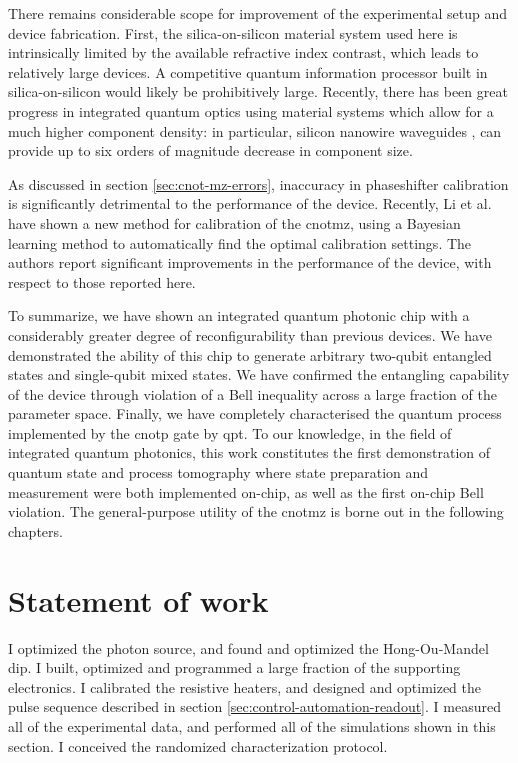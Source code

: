 There remains considerable scope for improvement of the experimental setup and device fabrication. First, the silica-on-silicon material system used here is intrinsically limited by the available refractive index contrast, which leads to relatively large devices. A competitive quantum information processor built in silica-on-silicon would likely be prohibitively large. Recently, there has been great progress in integrated quantum optics using material systems which allow for a much higher component density: in particular, silicon nanowire waveguides \cite{Silverstone2013, Matsuda2012, Azzini2012, Takesue2008, Sharping2006, Bonneau2012, Martin2012}, can provide up to six orders of magnitude decrease in component size. 

As discussed in section \ref{sec:cnot-mz-errors}, inaccuracy in phaseshifter calibration is significantly detrimental to the performance of the device. Recently, Li et al. \cite{Li2013} have shown a new method for calibration of the \gls{cnotmz}, using a Bayesian learning method to automatically find the optimal calibration settings. The authors report significant improvements in the performance of the device, with respect to those reported here.


To summarize, we have shown an integrated quantum photonic chip with a considerably greater degree of reconfigurability than previous devices. We have demonstrated the ability of this chip to generate arbitrary two-qubit entangled states and single-qubit mixed states. We have confirmed the entangling capability of the device through violation of a Bell inequality across a large fraction of the parameter space. Finally, we have completely characterised the quantum process implemented by the \gls{cnotp} gate by \gls{qpt}. To our knowledge, in the field of integrated quantum photonics, this work constitutes the first demonstration of quantum state and process tomography where state preparation and measurement were both implemented on-chip, as well as the first on-chip Bell violation.  
The general-purpose utility of the \gls{cnotmz} is borne out in the following chapters.

\section*{Statement of work}
I optimized the photon source, and found and optimized the Hong-Ou-Mandel dip. I built, optimized and programmed a large fraction of the supporting electronics. I calibrated the resistive heaters, and designed and optimized the pulse sequence described in section \ref{sec:control-automation-readout}. I measured all of the experimental data, and performed all of the simulations shown in this section. I conceived the randomized characterization protocol.



